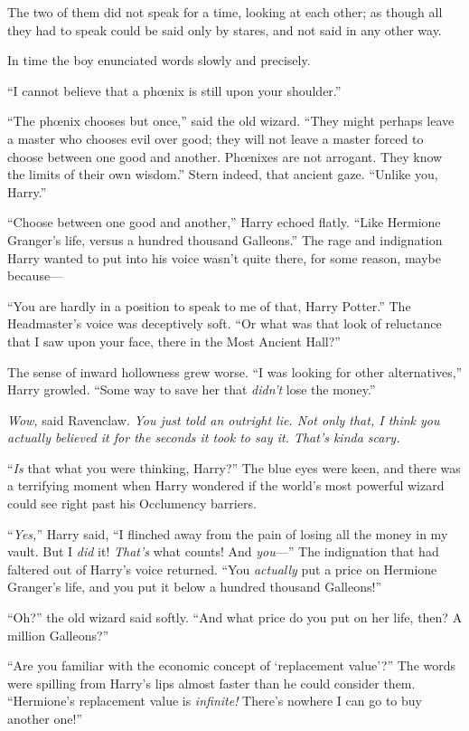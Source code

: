 The two of them did not speak for a time, looking at each other; as though all they had to speak could be said only by stares, and not said in any other way.

In time the boy enunciated words slowly and precisely.

“I cannot believe that a phœnix is still upon your shoulder.”

“The phœnix chooses but once,” said the old wizard. “They might perhaps leave a master who chooses evil over good; they will not leave a master forced to choose between one good and another. Phœnixes are not arrogant. They know the limits of their own wisdom.” Stern indeed, that ancient gaze. “Unlike you, Harry.”

“Choose between one good and another,” Harry echoed flatly. “Like Hermione Granger’s life, versus a hundred thousand Galleons.” The rage and indignation Harry wanted to put into his voice wasn’t quite there, for some reason, maybe because—

“You are hardly in a position to speak to me of that, Harry Potter.” The Headmaster’s voice was deceptively soft. “Or what was that look of reluctance that I saw upon your face, there in the Most Ancient Hall?”

The sense of inward hollowness grew worse. “I was looking for other alternatives,” Harry growled. “Some way to save her that \emph{didn’t} lose the money.”

\emph{Wow,} said Ravenclaw. \emph{You just told an outright lie. Not only that, I think you actually \emph{believed} it for the seconds it took to say it. That’s kinda scary.}

“\emph{Is} that what you were thinking, Harry?” The blue eyes were keen, and there was a terrifying moment when Harry wondered if the world’s most powerful wizard could see right past his Occlumency barriers.

“\emph{Yes,}” Harry said, “I flinched away from the pain of losing all the money in my vault. But I \emph{did} it! \emph{That’s} what counts! And \emph{you}—” The indignation that had faltered out of Harry’s voice returned. “You \emph{actually} put a price on Hermione Granger’s life, and you put it below a hundred thousand Galleons!”

“Oh?” the old wizard said softly. “And what price do you put on her life, then? A million Galleons?”

“Are you familiar with the economic concept of ‘replacement value’?” The words were spilling from Harry’s lips almost faster than he could consider them. “Hermione’s replacement value is \emph{infinite!} There’s nowhere I can go to buy another one!”

